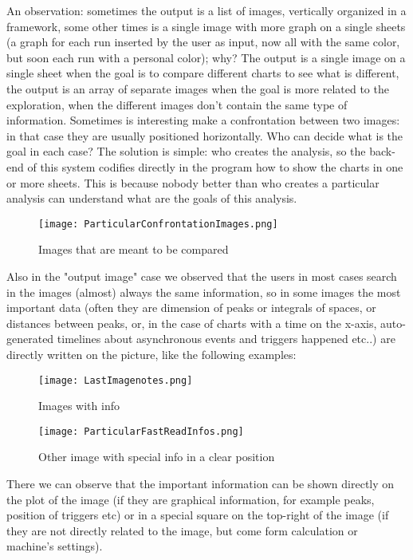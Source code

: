 An observation: sometimes the output is a list of images, vertically organized in a framework, some other times is a single image with more graph on a single sheets (a graph for each run inserted by the user as input, now all with the same color, but soon each run with a personal color); why?
The output is a single image on a single sheet when the goal is to compare different charts to see what is different, the output is an array of separate images when the goal is more related to the exploration, when the different images don't contain the same type of information. Sometimes is interesting make a confrontation between two images: in that case they are usually positioned horizontally. Who can decide what is the goal in each case? The solution is simple: who creates the analysis, so the back-end of this system codifies directly in the program how to show the charts in one or more sheets. This is because nobody better than who creates a particular analysis can understand what are the goals of this analysis.


\begin{figure}[H]
\centering
\texttt{[image: ParticularConfrontationImages.png]} 
\caption{Images that are meant to be compared}
\end{figure}   


Also in the "output image" case we observed that the users in most cases search in the images (almost) always the same information, so in some images the most important data (often they are dimension of peaks or integrals of spaces, or distances between peaks, or, in the case of charts with a time on the x-axis, auto-generated timelines about asynchronous events and triggers happened etc..) are directly written on the picture, like the following examples:

\begin{figure}[H]
\centering
\texttt{[image: LastImagenotes.png]} 
\caption{Images with info}
\end{figure}   

\begin{figure}[H]
\centering
\texttt{[image: ParticularFastReadInfos.png]} 
\caption{Other image with special info in a clear position }
\end{figure}   

There we can observe that the important information can be shown directly on the plot of the image (if they are graphical information, for example peaks, position of triggers etc) or in a special square on the top-right of the image (if they are not directly related to the image, but come form calculation or machine's settings).

